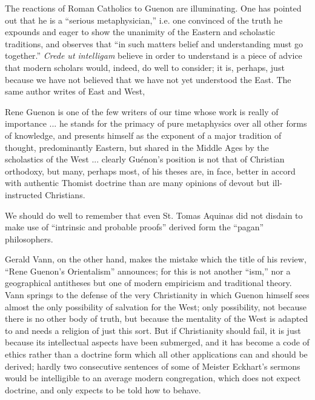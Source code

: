 The reactions of Roman Catholics to Guenon are illuminating. One has pointed out that he is a ``serious metaphysician,'' i.e. one convinced of the truth he expounds and eager to show the unanimity of the Eastern and scholastic traditions, and observes that ``in such matters belief and understanding must go together.'' \emph{Crede ut intelligam} believe in order to understand is a piece of advice that modern scholars would, indeed, do well to consider; it is, perhaps, just because we have not believed that we have not yet understood the East. The same author writes of East and West,

\begin{quotex}
Rene Guenon is one of the few writers of our time whose work is really of importance ... he stands for the primacy of pure metaphysics over all other forms of knowledge, and presents himself as the exponent of a major tradition of thought, predominantly Eastern, but shared in the Middle Ages by the scholastics of the West ... clearly Guénon's position is not that of Christian orthodoxy, but many, perhaps most, of his theses are, in face, better in accord with authentic Thomist doctrine than are many opinions of devout but ill-instructed Christians.
\end{quotex}


We should do well to remember that even St. Tomas Aquinas did not disdain to make use of ``intrinsic and probable proofs'' derived form the ``pagan'' philosophers.

Gerald Vann, on the other hand, makes the mistake which the title of his review, ``Rene Guenon's Orientalism'' announces; for this is not another ``ism,'' nor a geographical antitheses but one of modern empiricism and traditional theory. Vann springs to the defense of the very Christianity in which Guenon himself sees almost the only possibility of salvation for the West; only possibility, not because there is no other body of truth, but because the mentality of the West is adapted to and needs a religion of just this sort. But if Christianity should fail, it is just because its intellectual aspects have been submerged, and it has become a code of ethics rather than a doctrine form which all other applications can and should be derived; hardly two consecutive sentences of some of Meister Eckhart's sermons would be intelligible to an average modern congregation, which does not expect doctrine, and only expects to be told how to behave.

